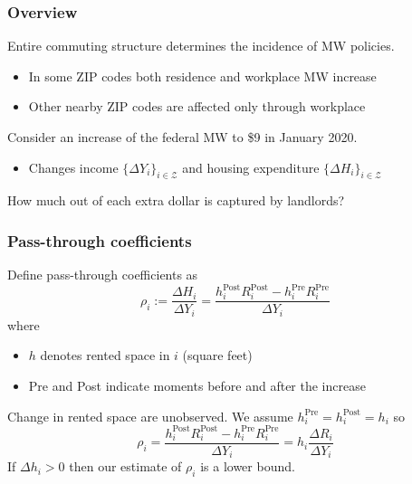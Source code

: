 \documentclass[aspectratio=169, t]{beamer}
\newcommand{\Z}{\mathcal{Z}}
\begin{document}
\begin{frame}
    \frametitle{Overview}
    
    Entire commuting structure determines the incidence of MW policies.
    \begin{itemize}
        \vspace{1mm}
        \item In some ZIP codes both residence and workplace MW increase
        \vspace{1mm}
        \item Other nearby ZIP codes are affected only through workplace
    \end{itemize}
    
    \pause
    \vspace{3mm}
    Consider an increase of the federal MW to \$9 in January 2020.
    \begin{itemize}
        \vspace{1mm}
        \item Changes income $\{\Delta Y_i\}_{i\in\Z}$ and housing expenditure $\{\Delta H_i\}_{i\in\Z}$
    \end{itemize}
    
    \pause
    \vspace{3mm}
    How much out of each extra dollar is captured by landlords?
   
\end{frame}

\begin{frame}
    \frametitle{Pass-through coefficients}

    Define pass-through coefficients as    
    \begin{equation*}
        \rho_i := \frac{\Delta H_i}{\Delta Y_i} =  \frac{h^{\text{Post}}_i R^{\text{Post}}_i - h^{\text{Pre}}_i R^{\text{Pre}}_i}{\Delta Y_i}
    \end{equation*}
    where 
    \begin{itemize}
        \item $h$ denotes rented space in $i$ (square feet)
        \item Pre and Post indicate moments before and after the increase
    \end{itemize}

    \pause
    \vspace{3mm}
    Change in rented space are unobserved. We assume $h^{\text{Pre}}_i = h^{\text{Post}}_i = h_i$ so
    \begin{equation*}
        \rho_i = \frac{h^{\text{Post}}_i R^{\text{Post}}_i - h^{\text{Pre}}_i R^{\text{Pre}}_i}{\Delta Y_i} = h_i \frac{\Delta R_i}{\Delta Y_i}
    \end{equation*}
    If $\Delta h_i > 0$ then our estimate of $\rho_i$ is a lower bound.

\end{frame}
\end{document}

